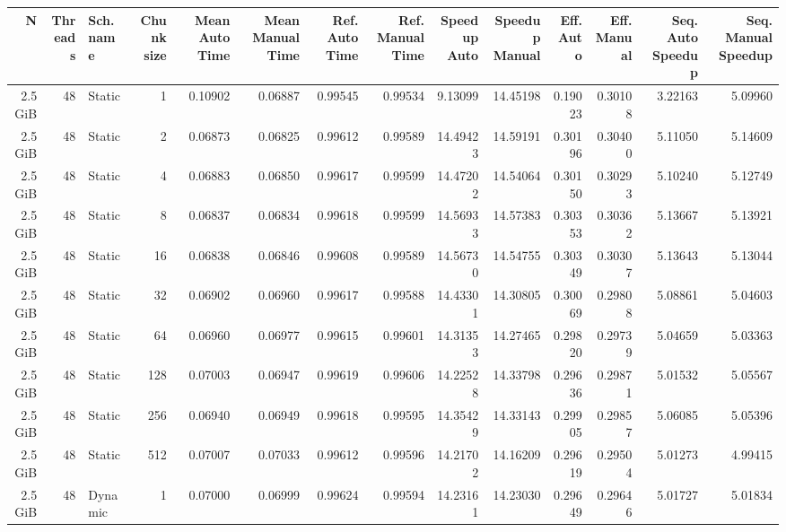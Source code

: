         \begin{table}[H]
            \centering
            \begin{adjustbox}{width=\textwidth, keepaspectratio}
                \begin{tabular}{rrlrrrrrrrrrrr}
                    \toprule
                    N & Threads & Sch. name & Chunk size & Mean Auto Time & Mean Manual Time & Ref. Auto Time & Ref. Manual Time & Speedup Auto & Speedup Manual & Eff. Auto & Eff. Manual & Seq. Auto Speedup & Seq. Manual Speedup \\
                    \midrule
                    2.5 GiB & 48 & Static & 1 & 0.10902 & 0.06887 & 0.99545 & 0.99534 & 9.13099 & 14.45198 & 0.19023 & 0.30108 & 3.22163 & 5.09960 \\
                    2.5 GiB & 48 & Static & 2 & 0.06873 & 0.06825 & 0.99612 & 0.99589 & 14.49423 & 14.59191 & 0.30196 & 0.30400 & 5.11050 & 5.14609 \\
                    2.5 GiB & 48 & Static & 4 & 0.06883 & 0.06850 & 0.99617 & 0.99599 & 14.47202 & 14.54064 & 0.30150 & 0.30293 & 5.10240 & 5.12749 \\
                    2.5 GiB & 48 & Static & 8 & 0.06837 & 0.06834 & 0.99618 & 0.99599 & 14.56933 & 14.57383 & 0.30353 & 0.30362 & 5.13667 & 5.13921 \\
                    2.5 GiB & 48 & Static & 16 & 0.06838 & 0.06846 & 0.99608 & 0.99589 & 14.56730 & 14.54755 & 0.30349 & 0.30307 & 5.13643 & 5.13044 \\
                    2.5 GiB & 48 & Static & 32 & 0.06902 & 0.06960 & 0.99617 & 0.99588 & 14.43301 & 14.30805 & 0.30069 & 0.29808 & 5.08861 & 5.04603 \\
                    2.5 GiB & 48 & Static & 64 & 0.06960 & 0.06977 & 0.99615 & 0.99601 & 14.31353 & 14.27465 & 0.29820 & 0.29739 & 5.04659 & 5.03363 \\
                    2.5 GiB & 48 & Static & 128 & 0.07003 & 0.06947 & 0.99619 & 0.99606 & 14.22528 & 14.33798 & 0.29636 & 0.29871 & 5.01532 & 5.05567 \\
                    2.5 GiB & 48 & Static & 256 & 0.06940 & 0.06949 & 0.99618 & 0.99595 & 14.35429 & 14.33143 & 0.29905 & 0.29857 & 5.06085 & 5.05396 \\
                    2.5 GiB & 48 & Static & 512 & 0.07007 & 0.07033 & 0.99612 & 0.99596 & 14.21702 & 14.16209 & 0.29619 & 0.29504 & 5.01273 & 4.99415 \\
                    2.5 GiB & 48 & Dynamic & 1 & 0.07000 & 0.06999 & 0.99624 & 0.99594 & 14.23161 & 14.23030 & 0.29649 & 0.29646 & 5.01727 & 5.01834 \\

\end{tabular}
\end{adjustbox}
\end{table}
